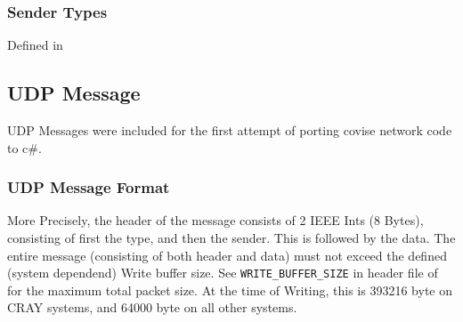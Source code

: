 \subsubsection{Sender Types}

Defined in 

\begin{messagetypes}
\end{messagetypes}

\subsection{UDP Message}

UDP Messages were included for the first attempt of porting covise network code to c\#.

\subsubsection{UDP Message Format}

\begin{messagedesc}
\end{messagedesc}

More Precisely, the header of the message consists of 2 IEEE Ints (8 Bytes), consisting of first the type, and then the sender. This is followed by the data. The entire message (consisting of both header and data) must not exceed the defined (system dependend) Write buffer size. See \lstinline|WRITE_BUFFER_SIZE| in header file of  for the maximum total packet size. At the time of Writing, this is 393216 byte on CRAY systems, and 64000 byte on all other systems.

